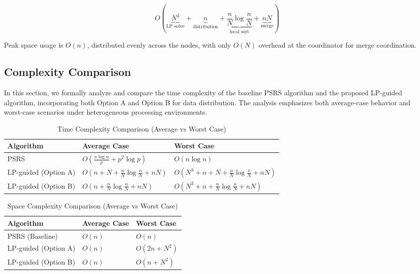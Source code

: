 \documentclass[]{interact}
\theoremstyle{plain}
\theoremstyle{definition}
\theoremstyle{remark}
\begin{document}
\begin{equation}
    O\left( 
        \underbrace{N^3}_{\text{LP solve}} 
        + \underbrace{n}_{\text{distribution}} 
        + \underbrace{\frac{n}{N} \log \frac{n}{N}}_{\text{local sort}} 
        + \underbrace{nN}_{\text{merge}}
    \right)
\end{equation}

Peak space usage is $O(n)$, distributed evenly across the nodes, with only $O(N)$ overhead at the coordinator for merge coordination.




\subsection{Complexity Comparison}
In this section, we formally analyze and compare the time complexity of the baseline PSRS algorithm and the proposed LP-guided algorithm, incorporating both Option A and Option B for data distribution. The analysis emphasizes both average-case behavior and worst-case scenarios under heterogeneous processing environments.


















\begin{table}[ht]
\centering
\footnotesize
\renewcommand{\arraystretch}{1.5} %
\begin{tabular}{|p{3.7cm}|p{4cm}|p{5.4cm}|}
\hline
\textbf{Algorithm} & \textbf{Average Case} & \textbf{Worst Case} \\ \hline
PSRS & $O\left(\frac{n \log n}{p} + p^2 \log p\right)$ & $O(n \log n)$ \\ \hline
LP-guided (Option A) & $O(n + N + \frac{n}{N} \log \frac{n}{N} + nN)$ & $O(N^3 + n + N + \frac{n}{N} \log \frac{n}{N} + nN)$ \\ \hline
LP-guided (Option B) & $O(n + \frac{n}{N} \log \frac{n}{N} + nN)$ & $O(N^3 + n + \frac{n}{N} \log \frac{n}{N} + nN)$ \\ \hline
\end{tabular}
\caption{Time Complexity Comparison (Average vs Worst Case)}
\end{table}

\begin{table}[h]
\centering
\footnotesize
\renewcommand{\arraystretch}{1.5} %
\begin{tabular}{|p{4.35cm}|p{4.35cm}|p{4.35cm}|}
\hline
\textbf{Algorithm} & \textbf{Average Case} & \textbf{Worst Case} \\
\hline
PSRS (Baseline) & $O(n)$ & $O(n)$ \\
\hline
LP-guided (Option A) & $O(n)$ & $O(2n + N^2)$ \\
\hline
LP-guided (Option B) & $O(n)$ & $O(n + N^2)$ \\
\hline
\end{tabular}
\caption{Space Complexity Comparison (Average vs Worst Case)}
\end{table}
\end{document}

